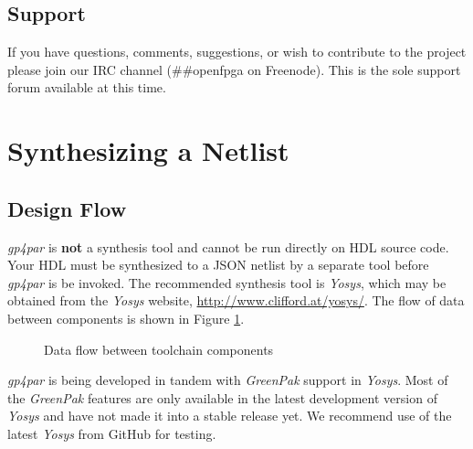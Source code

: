 \documentclass[11pt]{article}
\renewcommand\emph\textbf
\newcommand{\namestyle}[1]{\textit{#1}}
\begin{document}
\subsection{Support}

If you have questions, comments, suggestions, or wish to contribute to the project please join our IRC channel
(\#\#openfpga on Freenode). This is the sole support forum available at this time.

\pagebreak
\section{Synthesizing a Netlist}

\subsection{Design Flow}

\namestyle{gp4par} is \emph{not} a synthesis tool and cannot be run directly on HDL source code. Your HDL must be
synthesized to a JSON netlist by a separate tool before \namestyle{gp4par} is be invoked. The recommended synthesis
tool is \namestyle{Yosys}, which may be obtained from the \namestyle{Yosys} website,
\mbox{\url{http://www.clifford.at/yosys/}}. The flow of data between components is shown in Figure \ref{flow}.

\begin{figure}[h]
\centering


\caption{Data flow between toolchain components}
\label{flow}
\end{figure}

\namestyle{gp4par} is being developed in tandem with \namestyle{GreenPak} support in \namestyle{Yosys}. Most of the
\namestyle{GreenPak} features are only available in the latest development version of \namestyle{Yosys} and have not
made it into a stable release yet. We recommend use of the latest \namestyle{Yosys} from GitHub for testing.
\end{document}
